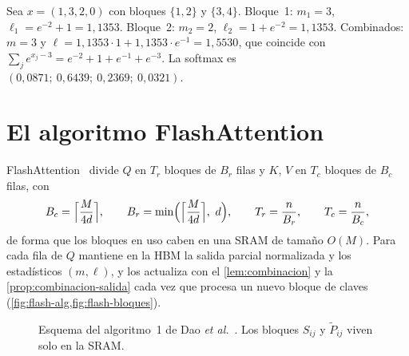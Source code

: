 \begin{ejemplo}\label{ej:online}
Sea $x=(1,3,2,0)$ con bloques $\{1,2\}$ y $\{3,4\}$. Bloque~1: $m_1=3$, $\ell_1=e^{-2}+1=1{,}1353$. Bloque~2: $m_2=2$, $\ell_2=1+e^{-2}=1{,}1353$. Combinados: $m=3$ y $\ell=1{,}1353\cdot 1+1{,}1353\cdot e^{-1}=1{,}5530$, que coincide con $\sum_je^{x_j-3}=e^{-2}+1+e^{-1}+e^{-3}$. La softmax es $(0{,}0871;\ 0{,}6439;\ 0{,}2369;\ 0{,}0321)$.
\end{ejemplo}

\section{El algoritmo FlashAttention}

FlashAttention~\cite[algoritmo~1]{flash} divide $Q$ en $T_r$ bloques de $B_r$ filas y $K$, $V$ en $T_c$ bloques de $B_c$ filas, con
\[
B_c=\Bigl\lceil\frac{M}{4d}\Bigr\rceil,\qquad B_r=\min\Bigl(\Bigl\lceil\frac{M}{4d}\Bigr\rceil,\ d\Bigr),\qquad T_r=\frac{n}{B_r},\qquad T_c=\frac{n}{B_c},
\]
de forma que los bloques en uso caben en una SRAM de tamaño $O(M)$. Para cada fila de $Q$ mantiene en la HBM la salida parcial normalizada y los estadísticos $(m,\ell)$, y los actualiza con el \cref{lem:combinacion} y la \cref{prop:combinacion-salida} cada vez que procesa un nuevo bloque de claves (\cref{fig:flash-alg,fig:flash-bloques}).

\begin{figure}[h]
\centering
{}
\caption{Esquema del algoritmo~1 de Dao \emph{et al.}~\cite{flash}. Los bloques $S_{ij}$ y $\tilde P_{ij}$ viven solo en la SRAM.}
\label{fig:flash-alg}
\end{figure}


